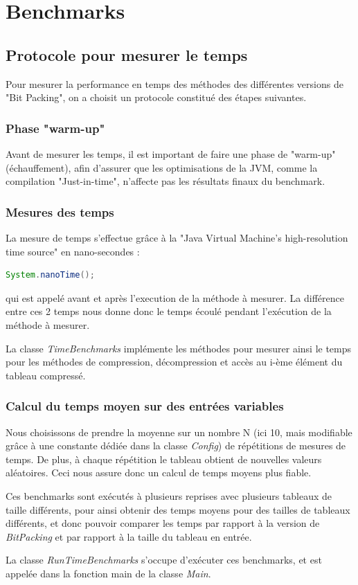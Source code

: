 \documentclass[titlepage]{article}
\begin{document}
\clearpage




\section{Benchmarks}

\subsection{Protocole pour mesurer le temps}

Pour mesurer la performance en temps des méthodes des différentes versions de "Bit Packing", on a choisit un protocole constitué des étapes suivantes.

\subsubsection{Phase "warm-up"}

Avant de mesurer les temps, il est important de faire une phase de "warm-up" (échauffement), afin d'assurer que les optimisations de la JVM, comme la compilation "Just-in-time", n'affecte pas les résultats finaux du benchmark.

\subsubsection{Mesures des temps}

La mesure de temps s'effectue grâce à la "Java Virtual Machine's high-resolution time source" en nano-secondes :
\begin{lstlisting}[language=Java] 
System.nanoTime(); 
\end{lstlisting} 
qui est appelé avant et après l'execution de la méthode à mesurer. La différence entre ces 2 temps nous donne donc le temps écoulé pendant l'exécution de la méthode à mesurer.
\par La classe \textsl{TimeBenchmarks} implémente les méthodes pour mesurer ainsi le temps pour les méthodes de compression, décompression et accès au i-ème élément du tableau compressé.

\subsubsection{Calcul du temps moyen sur des entrées variables}

Nous choisissons de prendre la moyenne sur un nombre N (ici 10, mais modifiable grâce à une constante dédiée dans la classe \textsl{Config}) de répétitions de mesures de temps. De plus, à chaque répétition le tableau obtient de nouvelles valeurs aléatoires. Ceci nous assure donc un calcul de temps moyens plus fiable.
\par Ces benchmarks sont exécutés à plusieurs reprises avec plusieurs tableaux de taille différents, pour ainsi obtenir des temps moyens pour des tailles de tableaux différents, et donc pouvoir comparer les temps par rapport à la version de \textsl{BitPacking} et par rapport à la taille du tableau en entrée.
\par La classe \textsl{RunTimeBenchmarks} s'occupe d'exécuter ces benchmarks, et est appelée dans la fonction main de la classe \textsl{Main}.
\end{document}
